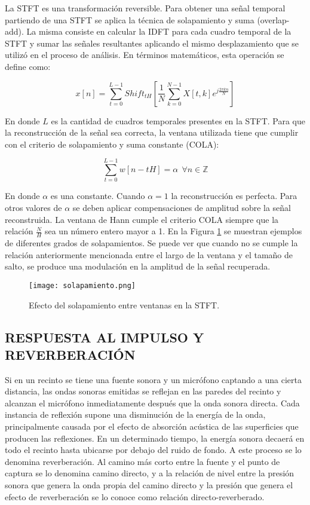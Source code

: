 La STFT es una transformación reversible. Para obtener una señal temporal partiendo de una STFT se aplica la técnica de solapamiento y suma (overlap-add). La misma consiste en calcular la IDFT para cada cuadro temporal de la STFT y sumar las señales resultantes aplicando el mismo desplazamiento que se utilizó en el proceso de análisis. En términos matemáticos, esta operación se define como:

\begin{equation}
\label{eqn:ISTFT}
	x[n] = \sum_{t=0}^{L-1}Shift_{tH}[\frac{1}{N}\sum_{k=0}^{N-1}X[t,k]e^{j\frac{2\pi kn}{N}}]
\end{equation}

En donde $L$ es la cantidad de cuadros temporales presentes en la STFT. Para que la reconstrucción de la señal sea correcta, la ventana utilizada tiene que cumplir con el criterio de solapamiento y suma constante (COLA):

\begin{equation}
\label{eqn:COLA}
		\sum_{t=0}^{L-1}w[n-tH] = \alpha \ \ \forall n \in  \mathbb{Z}
\end{equation}

En donde $\alpha$ es una constante. Cuando $\alpha = 1$ la reconstrucción es perfecta. Para otros valores de $\alpha$ se deben aplicar compensaciones de amplitud sobre la señal reconstruida. La ventana de Hann cumple el criterio COLA siempre que la relación $\frac{N}{H}$ sea un número entero mayor a 1. En la Figura \ref{fig:solapa} se muestran ejemplos de diferentes grados de solapamientos. Se puede ver que cuando no se cumple la relación anteriormente mencionada entre el largo de la ventana y el tamaño de salto, se produce una modulación en la amplitud de la señal recuperada. 

 \begin{figure}[H]
  \centering{}
  \texttt{[image: solapamiento.png]}
  \caption{Efecto del solapamiento entre ventanas en la STFT.}
  \label{fig:solapa}
\end{figure}

\subsection[Respuesta al impulso y reverberación]{RESPUESTA AL IMPULSO Y REVERBERACIÓN}

Si en un recinto se tiene una fuente sonora y un micrófono captando a una cierta distancia, las ondas sonoras emitidas se reflejan en las paredes del recinto y alcanzan el micrófono inmediatamente después que la onda sonora directa. Cada instancia de reflexión supone una disminución de la energía de la onda, principalmente causada por el efecto de absorción acústica de las superficies que producen las reflexiones. En un determinado tiempo, la energía sonora decaerá en todo el recinto hasta ubicarse por debajo del ruido de fondo. A este proceso se lo denomina reverberación. Al camino más corto entre la fuente y el punto de captura se lo denomina camino directo, y a la relación de nivel entre la presión sonora que genera la onda propia del camino directo y la presión que genera el efecto de reverberación se lo conoce como relación directo-reverberado. 

